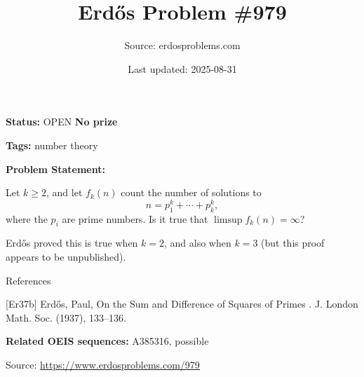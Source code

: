 \documentclass{article}
\title{Erd\H{o}s Problem \#979}
\date{Last updated: 2025-08-31}
\author{Source: erdosproblems.com}
\begin{document}
\maketitle

\noindent\textbf{Status:} OPEN \quad \textbf{No prize}

\noindent\textbf{Tags:} number theory

\medskip

\noindent\textbf{Problem Statement:}

Let $k\geq 2$, and let $f_k(n)$ count the number of solutions to\[n=p_1^k+\cdots+p_k^k,\]where the $p_i$ are prime numbers. Is it true that $\limsup f_k(n)=\infty$?




Erd\H{o}s \cite{Er37b} proved this is true when $k=2$, and also when $k=3$ (but this proof appears to be unpublished).




References

[Er37b] Erd\H{o}s, Paul, On the Sum and {D}ifference of Squares of {P}rimes . J. London Math. Soc. (1937), 133--136.

\noindent\textbf{Related OEIS sequences:} A385316, possible


\bigskip
\noindent\small{Source: \url{https://www.erdosproblems.com/979}}
\end{document}
